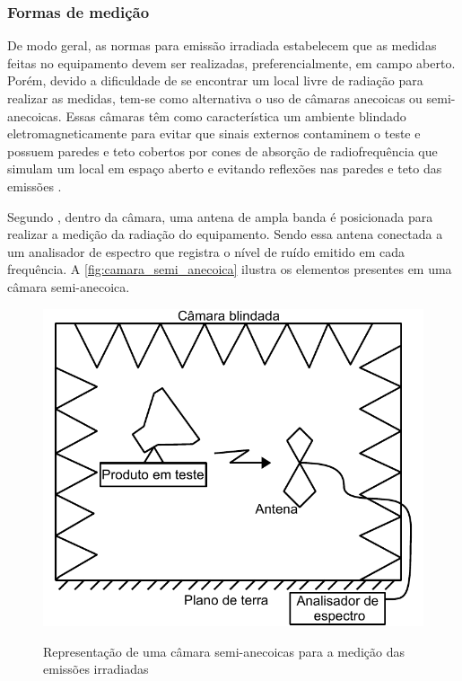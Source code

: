             \subsubsection{Formas de medição} \label{cap:fund_emc_norma_medicao}
             
            De modo geral, as normas para emissão irradiada estabelecem que as medidas feitas no equipamento devem ser realizadas, preferencialmente, em campo aberto. Porém, devido a dificuldade de se encontrar um local livre de radiação para realizar as medidas, tem-se como alternativa o uso de câmaras anecoicas ou semi-anecoicas. Essas câmaras têm como característica um ambiente blindado eletromagneticamente para evitar que sinais externos contaminem o teste e possuem paredes e teto cobertos por cones de absorção de radiofrequência que simulam um local em espaço aberto e evitando reflexões nas paredes e teto das emissões \cite{ref:EMC_phd_schlichting, ref:EMC_livro_Paul}. 
            
            Segundo , dentro da câmara, uma antena de ampla banda é posicionada para realizar a medição da radiação do equipamento. Sendo essa antena conectada a um analisador de espectro que registra o nível de ruído emitido em cada frequência. A \autoref{fig:camara_semi_anecoica} ilustra os elementos presentes em uma câmara semi-anecoica. 
            
            \begin{figure}[H]
            	\centering
            	\caption{Representação de uma câmara semi-anecoicas para a medição das emissões irradiadas}
            	\includegraphics[scale=1]{pdf/outros/camaca_emc.pdf}
            	\label{fig:camara_semi_anecoica}
            \end{figure}
            
